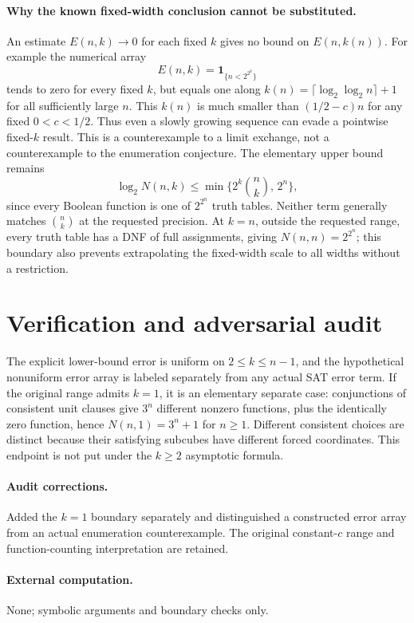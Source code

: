 \documentclass[11pt]{article}
\begin{document}
\paragraph{Why the known fixed-width conclusion cannot be substituted.}
An estimate $E(n,k)\to0$ for each fixed $k$ gives no bound on
$E(n,k(n))$. For example the numerical array
\[
 E(n,k)=\mathbf1_{\{n<2^{2^k}\}}
\]
tends to zero for every fixed $k$, but equals one along
$k(n)=\lceil\log_2\log_2 n\rceil+1$ for all sufficiently large $n$.
This $k(n)$ is much smaller than $(1/2-c)n$ for any fixed $0<c<1/2$.
Thus even a slowly growing sequence can evade a pointwise fixed-$k$ result.
This is a counterexample to a limit exchange, not a counterexample to the
enumeration conjecture.
The elementary upper bound remains
\[
 \log_2 N(n,k)\leq\min\{2^k\binom nk,\,2^n\},
\]
since every Boolean function is one of $2^{2^n}$ truth tables. Neither term
generally matches $\binom nk$ at the requested precision. At $k=n$, outside
the requested range, every truth table has a DNF of full assignments, giving
$N(n,n)=2^{2^n}$; this boundary also prevents extrapolating the fixed-width
scale to all widths without a restriction.

\section{Verification and adversarial audit}

The explicit lower-bound error is uniform on $2\leq k\leq n-1$, and the
hypothetical nonuniform error array is labeled separately from any actual SAT
error term. If the original range admits $k=1$, it is an elementary separate
case: conjunctions of consistent unit clauses give $3^n$ different nonzero
functions, plus the identically zero function, hence $N(n,1)=3^n+1$ for $n\geq1$.
Different consistent choices are distinct because their satisfying subcubes have
different forced coordinates. This endpoint is not put under the $k\geq2$
asymptotic formula.

\paragraph{Audit corrections.} Added the $k=1$ boundary separately and distinguished a constructed error
array from an actual enumeration counterexample. The original constant-$c$
range and function-counting interpretation are retained.
\paragraph{External computation.} None; symbolic arguments and boundary checks only.
\end{document}
